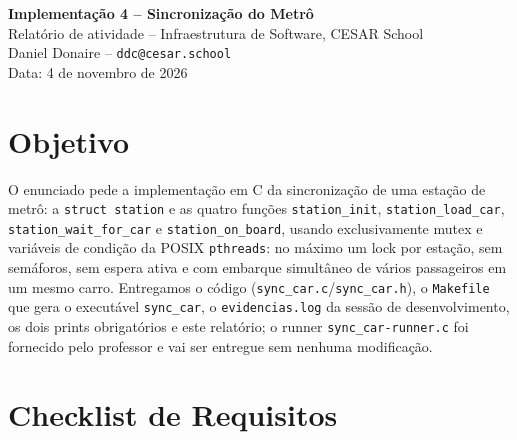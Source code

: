 \documentclass[11pt,a4paper]{article}
\begin{document}
\begin{center}
  {\LARGE\bfseries Implementação 4 -- Sincronização do Metrô}\\[6pt]
  {\large Relatório de atividade -- Infraestrutura de Software, CESAR School}\\[6pt]
  Daniel Donaire -- \texttt{ddc@cesar.school}\\
  Data: 4 de novembro de 2026
\end{center}
\vspace{4pt}

\section{Objetivo}

O enunciado pede a implementação em C da sincronização de uma estação de metrô:
a \texttt{struct station} e as quatro funções \texttt{station\_init},
\texttt{station\_load\_car}, \texttt{station\_wait\_for\_car} e
\texttt{station\_on\_board}, usando exclusivamente mutex e variáveis de condição
da POSIX \texttt{pthreads}: no máximo um lock por estação, sem semáforos, sem
espera ativa e com embarque simultâneo de vários passageiros em um mesmo carro.
Entregamos o código (\texttt{sync\_car.c}/\texttt{sync\_car.h}), o
\texttt{Makefile} que gera o executável \texttt{sync\_car}, o
\texttt{evidencias.log} da sessão de desenvolvimento, os dois prints obrigatórios
e este relatório; o runner \texttt{sync\_car-runner.c} foi fornecido pelo
professor e vai ser entregue sem nenhuma modificação.

\section{Checklist de Requisitos}
\end{document}
